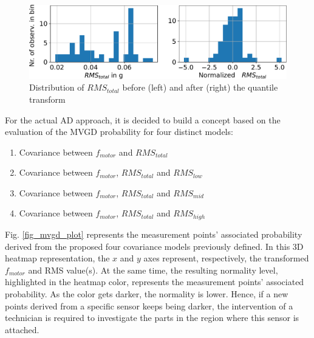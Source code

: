\documentclass[conference]{IEEEtran}
\begin{document}

\begin{figure}[htbp]
\centerline{\includegraphics[width=\columnwidth]{graphics/quantile_transform_data/quantile_transform_data_ohne.pdf}}
\caption{Distribution of $RMS_{total}$ before (left) and after (right) the quantile transform}
\label{fig_transform_result}
\end{figure}

For the actual AD approach, it is decided to build a concept based on the evaluation of the MVGD probability for four distinct models:

\begin{enumerate}
	\item Covariance between $f_{motor}$ and $RMS_{total}$
	\item Covariance between $f_{motor}$, $RMS_{total}$ and $RMS_{low}$
	\item Covariance between $f_{motor}$, $RMS_{total}$ and $RMS_{mid}$
	\item Covariance between $f_{motor}$, $RMS_{total}$ and $RMS_{high}$
\end{enumerate}


Fig. \ref{fig_mvgd_plot} represents the measurement points' associated probability derived from the proposed four covariance models previously defined. In this 3D heatmap representation, the $x$ and $y$ axes represent, respectively, the transformed $f_{motor}$ and RMS value(s). At the same time, the resulting normality level, highlighted in the heatmap color, represents the measurement points' associated probability. As the color gets darker, the normality is lower. Hence, if a new points  derived from a specific sensor keeps being darker, the intervention of a technician is required to investigate the parts in the region where this sensor is attached. 
\end{document}
